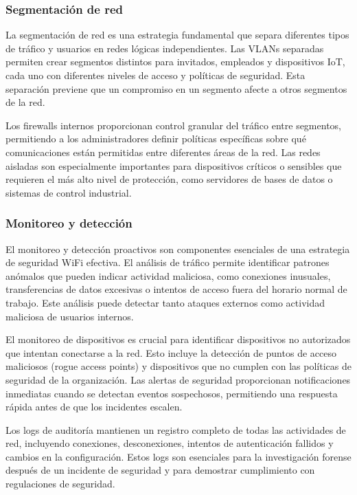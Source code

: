 \subsubsection{Segmentación de red}

La segmentación de red es una estrategia fundamental que separa diferentes tipos de tráfico y usuarios en redes lógicas independientes. Las VLANs separadas permiten crear segmentos distintos para invitados, empleados y dispositivos IoT, cada uno con diferentes niveles de acceso y políticas de seguridad. Esta separación previene que un compromiso en un segmento afecte a otros segmentos de la red.

Los firewalls internos proporcionan control granular del tráfico entre segmentos, permitiendo a los administradores definir políticas específicas sobre qué comunicaciones están permitidas entre diferentes áreas de la red. Las redes aisladas son especialmente importantes para dispositivos críticos o sensibles que requieren el más alto nivel de protección, como servidores de bases de datos o sistemas de control industrial.

\subsubsection{Monitoreo y detección}

El monitoreo y detección proactivos son componentes esenciales de una estrategia de seguridad WiFi efectiva. El análisis de tráfico permite identificar patrones anómalos que pueden indicar actividad maliciosa, como conexiones inusuales, transferencias de datos excesivas o intentos de acceso fuera del horario normal de trabajo. Este análisis puede detectar tanto ataques externos como actividad maliciosa de usuarios internos.

El monitoreo de dispositivos es crucial para identificar dispositivos no autorizados que intentan conectarse a la red. Esto incluye la detección de puntos de acceso maliciosos (rogue access points) y dispositivos que no cumplen con las políticas de seguridad de la organización. Las alertas de seguridad proporcionan notificaciones inmediatas cuando se detectan eventos sospechosos, permitiendo una respuesta rápida antes de que los incidentes escalen.

Los logs de auditoría mantienen un registro completo de todas las actividades de red, incluyendo conexiones, desconexiones, intentos de autenticación fallidos y cambios en la configuración. Estos logs son esenciales para la investigación forense después de un incidente de seguridad y para demostrar cumplimiento con regulaciones de seguridad.

